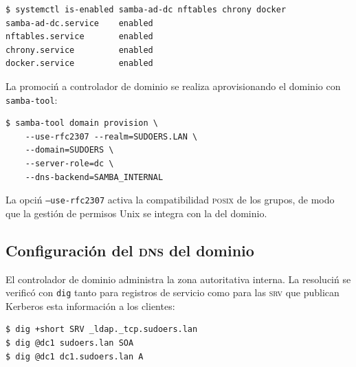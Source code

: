 \begin{lstlisting}[style=terminal]
$ systemctl is-enabled samba-ad-dc nftables chrony docker
samba-ad-dc.service    enabled
nftables.service       enabled
chrony.service         enabled
docker.service         enabled
\end{lstlisting}


La promoci\'n a controlador de dominio se realiza aprovisionando el dominio
con \texttt{samba-tool}:

\begin{lstlisting}[style=terminal]
$ samba-tool domain provision \
    --use-rfc2307 --realm=SUDOERS.LAN \
    --domain=SUDOERS \
    --server-role=dc \
    --dns-backend=SAMBA_INTERNAL
\end{lstlisting}

La opci\'n \texttt{--use-rfc2307} activa la compatibilidad \textsc{posix}
de los grupos, de modo que la gesti\'on de permisos Unix se integra con la
del dominio.

\subsection{Configuraci\'on del \textsc{dns} del dominio}

El controlador de dominio administra la zona autoritativa interna. La
resoluci\'n se verific\'o con \texttt{dig} tanto para registros de servicio
como para las \textsc{srv} que publican Kerberos esta informaci\'on a
los clientes:

\begin{lstlisting}[style=terminal]
$ dig +short SRV _ldap._tcp.sudoers.lan
$ dig @dc1 sudoers.lan SOA
$ dig @dc1 dc1.sudoers.lan A
\end{lstlisting}



